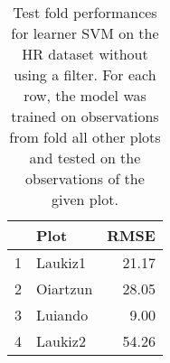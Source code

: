 \begin{table}[ht!]
\centering
\caption{Test fold performances for learner SVM on the HR dataset without using a filter. For each row, the model was trained on observations from fold all other plots and tested on the observations of the given plot.} 
\label{tab:svm-single-fold-perf}
\begin{tabular}{rlr}
  \hline
 & Plot & RMSE \\ 
  \hline
1 & Laukiz1 & 21.17 \\ 
  2 & Oiartzun & 28.05 \\ 
  3 & Luiando & 9.00 \\ 
  4 & Laukiz2 & 54.26 \\ 
   \hline
\end{tabular}
\end{table}
